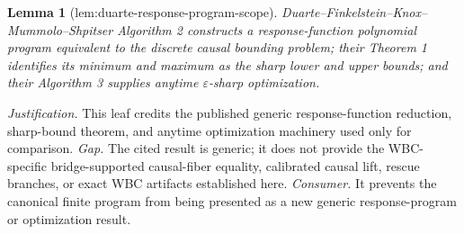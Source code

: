 \documentclass{article}
\newtheorem{lemma}{Lemma}
\begin{document}
\begin{lemma}[lem:duarte-response-program-scope]\label{lem:duarte-response-program-scope}
Duarte--Finkelstein--Knox--Mummolo--Shpitser Algorithm 2 constructs a response-function polynomial program equivalent to the discrete causal bounding problem; their Theorem 1 identifies its minimum and maximum as the sharp lower and upper bounds; and their Algorithm 3 supplies anytime \(\varepsilon\)-sharp optimization.
\end{lemma}
\par\smallskip\noindent \textit{Justification.} This leaf credits the published generic response-function reduction, sharp-bound theorem, and anytime optimization machinery used only for comparison. \textit{Gap.} The cited result is generic; it does not provide the WBC-specific bridge-supported causal-fiber equality, calibrated causal lift, rescue branches, or exact WBC artifacts established here. \textit{Consumer.} It prevents the canonical finite program from being presented as a new generic response-program or optimization result.
\end{document}
